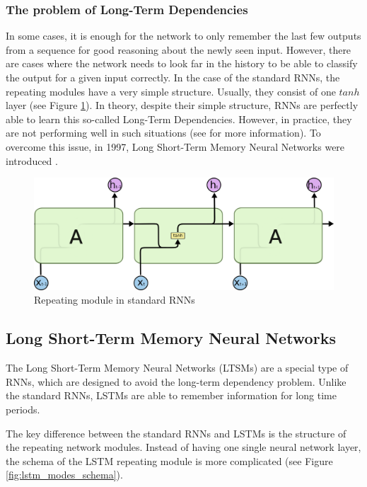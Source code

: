 \subsubsection{The problem of Long-Term Dependencies}

In some cases, it is enough for the network to only remember the last few outputs from a sequence for good reasoning about the newly seen input. However, there are cases where the network needs to look far in the history to be able to classify the output for a given input correctly. In the case of the standard RNNs, the repeating modules have a very simple structure. Usually, they consist of one $tanh$ layer (see Figure \ref{fig:simple_rnn}). In theory, despite their simple structure, RNNs are perfectly able to learn this so-called Long-Term Dependencies. However, in practice, they are not performing well in such situations (see \cite{RNN_long_term} for more information). To overcome this issue, in 1997, Long Short-Term Memory Neural Networks were introduced \cite{LSTM_paper}.


\begin{figure}[h!]
    \centering
    \includegraphics[scale=0.45]{figures/LSTM3-SimpleRNN.png}
    \caption{Repeating module in standard RNNs \cite{LSTM_blog}}
    \label{fig:simple_rnn}
\end{figure}


\subsection{Long Short-Term Memory Neural Networks}\label{tb:lstm}
The Long Short-Term Memory Neural Networks (LTSMs) are a special type of RNNs, which are designed to avoid the long-term dependency problem. Unlike the standard RNNs, LSTMs are able to remember information for long time periods. 


The key difference between the standard RNNs and LSTMs is the structure of the repeating network modules. Instead of having one single neural network layer, the schema of the LSTM repeating module is more complicated (see Figure \ref{fig:lstm_modes_schema}). 


